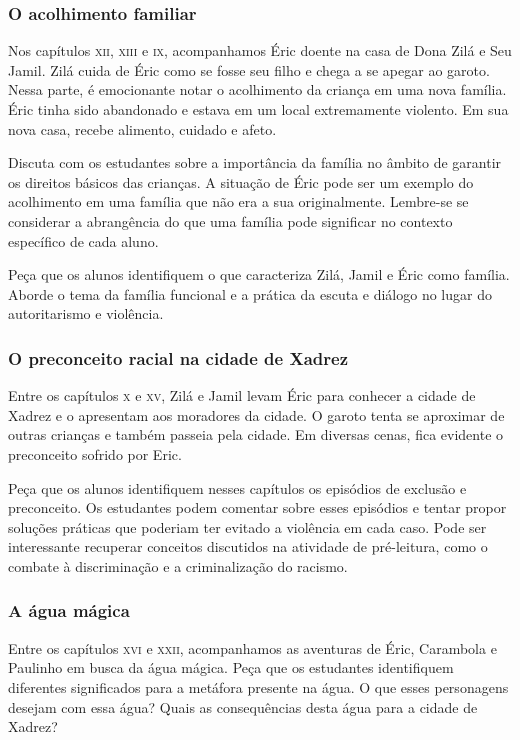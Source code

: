 \documentclass[11pt]{extarticle}
\begin{document}
\subsubsection{O acolhimento familiar}

Nos capítulos \textsc{xii}, \textsc{xiii} e \textsc{ix}, acompanhamos Éric doente na casa de Dona Zilá e Seu Jamil. Zilá cuida de Éric como se fosse seu filho e chega a se apegar ao garoto. Nessa parte, é emocionante notar o acolhimento da criança em uma nova família. Éric tinha sido abandonado e estava em um local extremamente violento. Em sua nova casa, recebe alimento, cuidado e afeto. 

Discuta com os estudantes sobre a importância da família no âmbito de garantir os direitos básicos das crianças. A situação de Éric pode ser um exemplo do acolhimento em uma família que não era a sua originalmente. Lembre-se se considerar a abrangência do que uma família pode significar no contexto específico de cada aluno. 

Peça que os alunos identifiquem o que caracteriza Zilá, Jamil e Éric como família. Aborde o tema da família funcional e a prática da escuta e diálogo no lugar do autoritarismo e violência.

\subsubsection{O preconceito racial na cidade de Xadrez}

Entre os capítulos \textsc{x} e \textsc{xv}, Zilá e Jamil levam Éric para conhecer a cidade de Xadrez e o apresentam aos moradores da cidade. O garoto tenta se aproximar de outras crianças e também passeia pela cidade. Em diversas cenas, fica evidente o preconceito sofrido por Eric.

Peça que os alunos identifiquem nesses capítulos os episódios de exclusão e preconceito. Os estudantes podem comentar sobre esses episódios e tentar propor soluções práticas que poderiam ter evitado a violência em cada caso. Pode ser interessante recuperar conceitos discutidos na atividade de pré-leitura, como o combate à discriminação e a criminalização do racismo.


\subsubsection{A água mágica}

Entre os capítulos \textsc{xvi} e \textsc{xxii}, acompanhamos as aventuras de Éric, Carambola e Paulinho em busca da água mágica. Peça que os estudantes identifiquem diferentes significados para a metáfora presente na água. O que esses personagens desejam com essa água? Quais as consequências desta água para a cidade de Xadrez?
\end{document}
